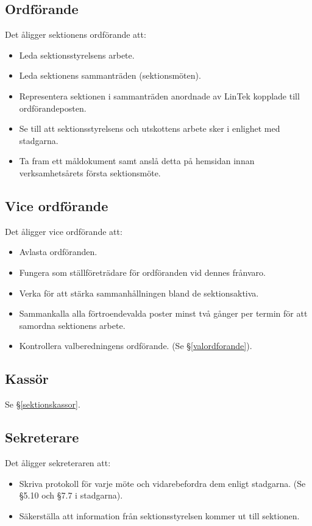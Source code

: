 \documentclass{datateknologsektionen-document}
\begin{document}
\subsection{Ordförande}
\label{ordforande}
Det åligger sektionens ordförande att:
\begin{itemize}
  \item Leda sektionsstyrelsens arbete.
  \item Leda sektionens sammanträden (sektionsmöten).
  \item Representera sektionen i sammanträden anordnade av LinTek kopplade till ordförandeposten.
  \item Se till att sektionsstyrelsens och utskottens arbete sker i enlighet med stadgarna.
  \item Ta fram ett måldokument samt anslå detta på hemsidan innan verksamhetsårets första sektionsmöte.
\end{itemize}
\subsection{Vice ordförande}
\label{viceordforande}
Det åligger vice ordförande att:
\begin{itemize}
  \item Avlasta ordföranden.
  \item Fungera som ställföreträdare för ordföranden vid dennes frånvaro.
  \item Verka för att stärka sammanhållningen bland de sektionsaktiva.
  \item Sammankalla alla förtroendevalda poster minst två gånger per termin för att samordna sektionens arbete.
  \item Kontrollera valberedningens ordförande. (Se \S \ref{valordforande}).
\end{itemize}

\subsection{Kassör}
\label{styrelsekassor}
Se \S \ref{sektionskassor}.
\subsection{Sekreterare}
\label{sekreterare}
Det åligger sekreteraren att:
\begin{itemize}
  \item Skriva protokoll för varje möte och vidarebefordra dem enligt stadgarna. (Se \S 5.10 och \S 7.7 i stadgarna).
  \item Säkerställa att information från sektionsstyrelsen kommer ut till sektionen.
\end{itemize}
\end{document}
